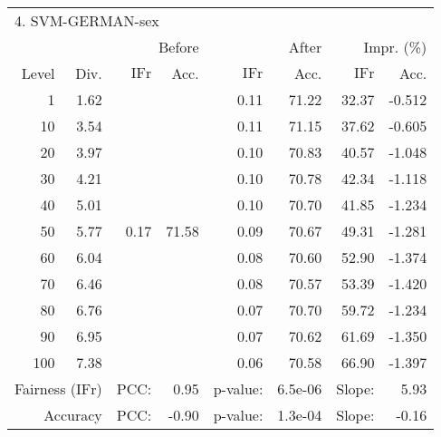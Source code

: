 \begin{tabular}{rr||rr|rr|rr}
\multicolumn{4}{l}{4. SVM-GERMAN-sex} & \multicolumn{2}{c}{} & \multicolumn{2}{c}{}\\
 &  & \multicolumn{2}{r|}{Before} & \multicolumn{2}{r|}{After} & \multicolumn{2}{r}{Impr. (\%)}\\
Level & Div. & $\mathrm{IFr}$ & Acc. & $\mathrm{IFr}$ & Acc. & $\mathrm{IFr}$ & Acc.\\
\hline
1 & 1.62 & \multirow{11}{*}{0.17} & \multirow{11}{*}{71.58} & 0.11 & 71.22 & 32.37 & -0.512\\
10 & 3.54 &  &  & 0.11 & 71.15 & 37.62 & -0.605\\
20 & 3.97 &  &  & 0.10 & 70.83 & 40.57 & -1.048\\
30 & 4.21 &  &  & 0.10 & 70.78 & 42.34 & -1.118\\
40 & 5.01 &  &  & 0.10 & 70.70 & 41.85 & -1.234\\
50 & 5.77 &  &  & 0.09 & 70.67 & 49.31 & -1.281\\
60 & 6.04 &  &  & 0.08 & 70.60 & 52.90 & -1.374\\
70 & 6.46 &  &  & 0.08 & 70.57 & 53.39 & -1.420\\
80 & 6.76 &  &  & 0.07 & 70.70 & 59.72 & -1.234\\
90 & 6.95 &  &  & 0.07 & 70.62 & 61.69 & -1.350\\
100 & 7.38 &  &  & 0.06 & 70.58 & 66.90 & -1.397\\
\hline
\multicolumn{2}{r}{Fairness ($\mathrm{IFr}$)} & PCC: & \multicolumn{1}{r}{0.95} & p-value:  & \multicolumn{1}{r}{6.5e-06} & Slope:  & 5.93\\
\multicolumn{2}{r}{Accuracy} & PCC: & \multicolumn{1}{r}{-0.90} & p-value:  & \multicolumn{1}{r}{1.3e-04} & Slope:  & -0.16\\
\end{tabular}